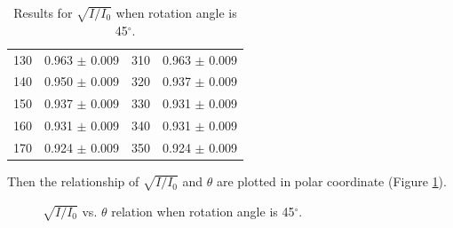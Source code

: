 \documentclass[a4paper]{article}
\begin{document}
\begin{table}[H]
\begin{tabular}{cc||cc}
		130                                & 0.963   $\pm$ 0.009 & 310                                & 0.963   $\pm$ 0.009 \\
		140                                & 0.950   $\pm$ 0.009 & 320                                & 0.937   $\pm$ 0.009 \\
		150                                & 0.937   $\pm$ 0.009 & 330                                & 0.931   $\pm$ 0.009 \\
		160                                & 0.931   $\pm$ 0.009 & 340                                & 0.931   $\pm$ 0.009 \\
		170                                & 0.924   $\pm$ 0.009 & 350                                & 0.924   $\pm$ 0.009 \\
		\hline
	\end{tabular}
	\caption{Results for $\sqrt{I/I_0}$ when rotation angle is 45$^\circ$.}\label{TableSqrt45}
\end{table}

Then the relationship of $\sqrt{I/I_0}$ and $\theta$ are plotted in polar coordinate (Figure \ref{fig::45degree}).

\begin{figure}[H]
	\centering
	\hspace{5mm}
	\hspace{5mm}
	\caption{$\sqrt{I/I_0}$ vs. $\theta$ relation when rotation angle is 45$^\circ$.}
	\label{fig::45degree}
\end{figure}
\end{document}
